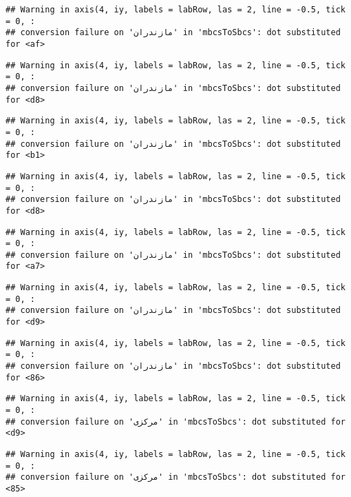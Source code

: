 \documentclass[
]{article}
\begin{document}
\begin{verbatim}
## Warning in axis(4, iy, labels = labRow, las = 2, line = -0.5, tick = 0, :
## conversion failure on 'مازندران' in 'mbcsToSbcs': dot substituted for <af>
\end{verbatim}

\begin{verbatim}
## Warning in axis(4, iy, labels = labRow, las = 2, line = -0.5, tick = 0, :
## conversion failure on 'مازندران' in 'mbcsToSbcs': dot substituted for <d8>
\end{verbatim}

\begin{verbatim}
## Warning in axis(4, iy, labels = labRow, las = 2, line = -0.5, tick = 0, :
## conversion failure on 'مازندران' in 'mbcsToSbcs': dot substituted for <b1>
\end{verbatim}

\begin{verbatim}
## Warning in axis(4, iy, labels = labRow, las = 2, line = -0.5, tick = 0, :
## conversion failure on 'مازندران' in 'mbcsToSbcs': dot substituted for <d8>
\end{verbatim}

\begin{verbatim}
## Warning in axis(4, iy, labels = labRow, las = 2, line = -0.5, tick = 0, :
## conversion failure on 'مازندران' in 'mbcsToSbcs': dot substituted for <a7>
\end{verbatim}

\begin{verbatim}
## Warning in axis(4, iy, labels = labRow, las = 2, line = -0.5, tick = 0, :
## conversion failure on 'مازندران' in 'mbcsToSbcs': dot substituted for <d9>
\end{verbatim}

\begin{verbatim}
## Warning in axis(4, iy, labels = labRow, las = 2, line = -0.5, tick = 0, :
## conversion failure on 'مازندران' in 'mbcsToSbcs': dot substituted for <86>
\end{verbatim}

\begin{verbatim}
## Warning in axis(4, iy, labels = labRow, las = 2, line = -0.5, tick = 0, :
## conversion failure on 'مرکزی' in 'mbcsToSbcs': dot substituted for <d9>
\end{verbatim}

\begin{verbatim}
## Warning in axis(4, iy, labels = labRow, las = 2, line = -0.5, tick = 0, :
## conversion failure on 'مرکزی' in 'mbcsToSbcs': dot substituted for <85>
\end{verbatim}
\end{document}
